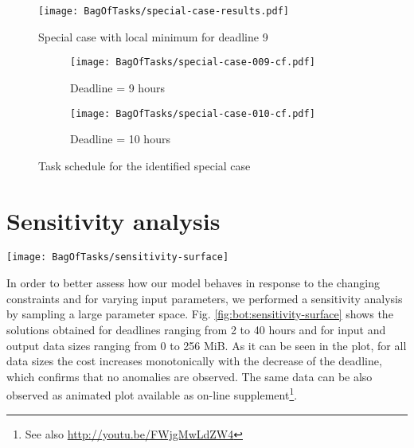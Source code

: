 {  \begin{figure}[tb]
     \centering \texttt{[image: BagOfTasks/special-case-results.pdf]}
     \caption{Special case with local minimum for deadline 9
     \label{fig:bot:special-case-results}}
  \end{figure}

  \begin{figure}[tb]
     \centering  
     \begin{subfigure}[b]{0.49\textwidth}
       \centering       
       \texttt{[image: BagOfTasks/special-case-009-cf.pdf]}
       \caption{Deadline = 9 hours}
       \label{fig:bot:special-case-009-cf}
     \end{subfigure}
     \begin{subfigure}[b]{0.49\textwidth}
       \centering       
       \texttt{[image: BagOfTasks/special-case-010-cf.pdf]}
       \caption{Deadline = 10 hours}
       \label{fig:bot:special-case-010-cf}
     \end{subfigure}
     \caption{Task schedule for the identified special case}
  \end{figure}
    
\section{Sensitivity analysis}
\label{sec:bot:sensitivity}
    
  \begin{figure*}[tb]
     \centering \texttt{[image: BagOfTasks/sensitivity-surface]}
     \caption{Optimal cost for a wide range of deadline constraints and data
     sizes.\label{fig:bot:sensitivity-surface}}
  \end{figure*} 
  
  In order to better assess how our model behaves in response to the changing
  constraints and for varying input parameters, we performed a sensitivity
  analysis by sampling a large parameter space.
  Fig. \ref{fig:bot:sensitivity-surface} shows the solutions obtained for deadlines
  ranging from 2 to 40 hours and for input and output data sizes ranging from
  0 to 256 MiB. As it can be seen in the plot, for all data sizes the cost
  increases monotonically with the decrease of the deadline, which confirms
  that no anomalies are observed. The same data can be also observed as
  animated plot available as on-line supplement\footnote{See also
  \url{http://youtu.be/FWjgMwLdZW4}}.
  
}
